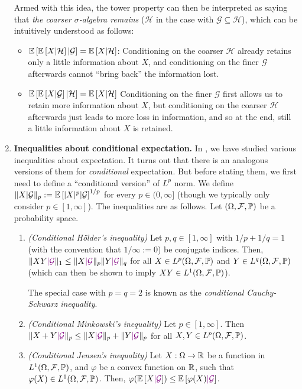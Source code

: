 \begin{enumerate}
\begin{remark}
Armed with this idea, the tower property can then be interpreted as saying that
\emph{the coarser \(\sigma\)-algebra remains} (\(\mathcal{H}\) in the case with
\(\mathcal{G}\subseteq \mathcal{H}\)), which can be intuitively understood as
follows:
\begin{itemize}
\item \(\mathbb{E}\left[\mathbb{E}\left[X|\mathcal{H}\right]|\mathcal{G}\right]=\mathbb{E}\left[X|\mathcal{H}\right]\):
Conditioning on the coarser \(\mathcal{H}\) already retains only a little
information about \(X\), and conditioning on the finer \(\mathcal{G}\)
afterwards cannot ``bring back'' the information lost.
\item \(\mathbb{E}\left[\mathbb{E}\left[X|\mathcal{G}\right]|\mathcal{H}\right]=\mathbb{E}\left[X|\mathcal{H}\right]\)
Conditioning on the finer \(\mathcal{G}\) first allows us to retain more
information about \(X\), but conditioning on the coarser \(\mathcal{H}\)
afterwards just leads to more loss in information, and so at the end, still a
little information about \(X\) is retained.
\end{itemize}
\end{remark}
\item \textbf{Inequalities about conditional expectation.}
In , we have
studied various inequalities about expectation. It turns out that there is an
analogous versions of them for \emph{conditional} expectation. But before
stating them, we first need to define a ``conditional version'' of \(L^{p}\)
norm. We define \(\|X|\mathcal{G}\|_{p}:=\mathbb{E}\left[|X|^{p}|\mathcal{G}\right]^{1/p}\)
for every \(p\in (0,\infty]\) (though we typically only consider \(p\in[1,\infty]\)).
The inequalities are as follows. Let \((\Omega,\mathcal{F},\mathbb{P})\) be a
probability space.
\begin{enumerate}
\item \label{it:cond-holder-cs-ineq} \emph{(Conditional H\"older's inequality)}
Let \(p,q\in [1,\infty]\) with \(1/p+1/q=1\) (with the convention that
\(1/\infty:=0\)) be conjugate indices. Then, \(\|XY\vc{|\mathcal{G}}\|_{1}\le
\|X\vc{|\mathcal{G}}\|_{p}\|Y\vc{|\mathcal{G}}\|_{q}\) for all \(X\in
L^{p}(\Omega,\mathcal{F},\mathbb{P})\) and \(Y\in L^{q}(\Omega,\mathcal{F},\mathbb{P})\)
(which can then be shown to imply \(XY\in L^{1}(\Omega,\mathcal{F},\mathbb{P})\)).

\begin{note}
The special case with \(p=q=2\) is known as the \emph{conditional
Cauchy-Schwarz inequality}.
\end{note}
\item \label{it:cond-minkowski-ineq} \emph{(Conditional Minkowski's inequality)}
Let \(p\in [1,\infty]\). Then \(\|X+Y\vc{|\mathcal{G}}\|_{p}\le \|X\vc{|\mathcal{G}}\|_{p}+\|Y\vc{|\mathcal{G}}\|_{p}\) for all
\(X,Y\in L^{p}(\Omega,\mathcal{F},\mathbb{P})\).
\item \label{it:cond-jensen-ineq} \emph{(Conditional Jensen's inequality)}
Let \(X:\Omega\to\mathbb{R}\) be a function in \(L^{1}(\Omega,\mathcal{F},\mathbb{P})\), and
\(\varphi\) be a convex function on \(\mathbb{R}\), such that \(\varphi(X)\in
L^{1}(\Omega,\mathcal{F},\mathbb{P})\). Then,
\(\varphi(\expv{X\vc{|\mathcal{G}}})\le\expv{\varphi(X)\vc{|\mathcal{G}}}\).


\end{enumerate}
\end{enumerate}
